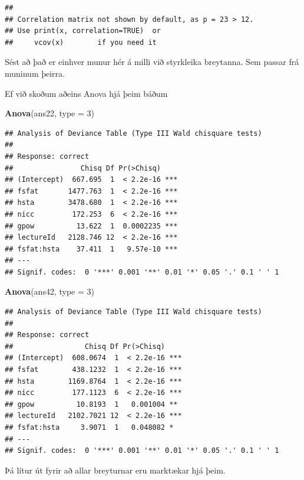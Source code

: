 \documentclass[
]{article}
\newenvironment{Shaded}{\begin{snugshade}}{\end{snugshade}}
\newcommand{\DataTypeTok}[1]{\textcolor[rgb]{0.13,0.29,0.53}{#1}}
\newcommand{\DecValTok}[1]{\textcolor[rgb]{0.00,0.00,0.81}{#1}}
\newcommand{\KeywordTok}[1]{\textcolor[rgb]{0.13,0.29,0.53}{\textbf{#1}}}
\newcommand{\NormalTok}[1]{#1}
\begin{document}
\begin{verbatim}
## 
## Correlation matrix not shown by default, as p = 23 > 12.
## Use print(x, correlation=TRUE)  or
##     vcov(x)        if you need it
\end{verbatim}

Sést að það er einhver munur hér á milli við styrkleika breytanna. Sem passar frá muninum þeirra.

Ef við skoðum aðeins Anova hjá þeim báðum

\begin{Shaded}
\begin{Highlighting}[]
\KeywordTok{Anova}\NormalTok{(ans22, }\DataTypeTok{type =} \DecValTok{3}\NormalTok{)}
\end{Highlighting}
\end{Shaded}

\begin{verbatim}
## Analysis of Deviance Table (Type III Wald chisquare tests)
## 
## Response: correct
##                Chisq Df Pr(>Chisq)    
## (Intercept)  667.695  1  < 2.2e-16 ***
## fsfat       1477.763  1  < 2.2e-16 ***
## hsta        3478.680  1  < 2.2e-16 ***
## nicc         172.253  6  < 2.2e-16 ***
## gpow          13.622  1  0.0002235 ***
## lectureId   2128.746 12  < 2.2e-16 ***
## fsfat:hsta    37.411  1   9.57e-10 ***
## ---
## Signif. codes:  0 '***' 0.001 '**' 0.01 '*' 0.05 '.' 0.1 ' ' 1
\end{verbatim}

\begin{Shaded}
\begin{Highlighting}[]
\KeywordTok{Anova}\NormalTok{(ans42, }\DataTypeTok{type =} \DecValTok{3}\NormalTok{)}
\end{Highlighting}
\end{Shaded}

\begin{verbatim}
## Analysis of Deviance Table (Type III Wald chisquare tests)
## 
## Response: correct
##                 Chisq Df Pr(>Chisq)    
## (Intercept)  608.0674  1  < 2.2e-16 ***
## fsfat        438.1232  1  < 2.2e-16 ***
## hsta        1169.8764  1  < 2.2e-16 ***
## nicc         177.1123  6  < 2.2e-16 ***
## gpow          10.8193  1   0.001004 ** 
## lectureId   2102.7021 12  < 2.2e-16 ***
## fsfat:hsta     3.9071  1   0.048082 *  
## ---
## Signif. codes:  0 '***' 0.001 '**' 0.01 '*' 0.05 '.' 0.1 ' ' 1
\end{verbatim}

Þá lítur út fyrir að allar breyturnar eru marktækar hjá þeim.
\end{document}
